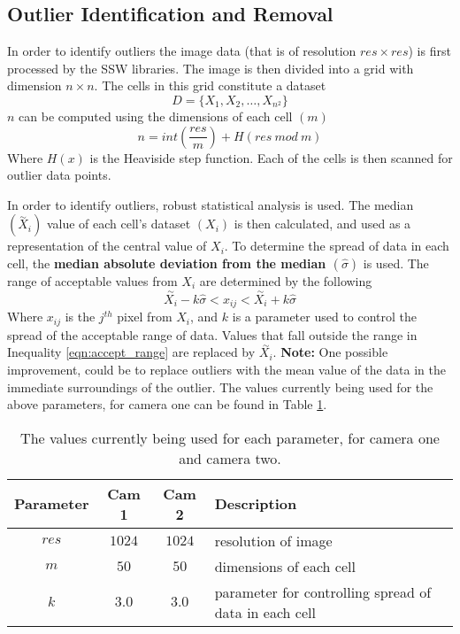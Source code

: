 \subsection{Outlier Identification and Removal}
In order to identify outliers the image data (that is of resolution $res \times res$) is first processed by the SSW libraries. The image is then divided into a grid with dimension $n \times n$. The cells in this grid constitute a dataset 
\begin{equation}
  D = \{X_1, X_2,\dots,X_{n^2}\}
\end{equation}
$n$ can be computed using the dimensions of each cell $\left(m\right)$
\begin{equation}
  n = int\left( \frac{res}{m} \right) + H\left(res\ mod\ m \right)
\end{equation}
Where $H(x)$ is the Heaviside step function. Each of the cells is then scanned for outlier data points.

In order to identify outliers, robust statistical analysis is used. The median $\left(\overset{\sim}{X}_i\right)$ value of each cell's dataset $\left(X_i\right)$ is then calculated, and used as a representation of the central value of $X_i$. To determine the spread of data in each cell, the \textbf{median absolute deviation from the median $\left(\hat{\sigma}\right)$} is used.  The range of acceptable values from $X_i$ are determined by the following
\begin{equation}
  \overset{\sim}{X_i} - k \hat{\sigma} < x_{ij} < \overset{\sim}{X_i} + k \hat{\sigma}
  \label{eqn:accept_range}
\end{equation}
Where $x_{ij}$ is the $j^{th}$ pixel from $X_i$, and $k$ is a parameter used to control the spread of the acceptable range of data. Values that fall outside the range in Inequality \ref{eqn:accept_range} are replaced by $\overset{\sim}{X_i}$. \textbf{Note:} One possible improvement, could be to replace outliers with the mean value of the data in the immediate surroundings of the outlier. The values currently being used for the above parameters, for camera one can be found in Table \ref{tbl_outlier_id_params}.

\begin{table}[h]
  \center
  \begin{tabular}{|c|c|c|l|}
    \hline 
    \rule[-1ex]{0pt}{2.5ex} Parameter & Cam 1 & Cam 2 & Description \\ 
    \hline  
    \rule[-1ex]{0pt}{2.5ex} $res$ & $1024$ & $1024$ & resolution of image \\
    \hline 
    \rule[-1ex]{0pt}{2.5ex} $m$ & $50$ & $50$ & dimensions of each cell \\ 
    \hline 
    \rule[-1ex]{0pt}{2.5ex} $k$ & $3.0$ & $3.0$ & parameter for controlling spread of data in each cell \\ 
    \hline 
  \end{tabular}
  \caption{The values currently being used for each parameter, for camera one and camera two.}
  \label{tbl_outlier_id_params}
\end{table}  

